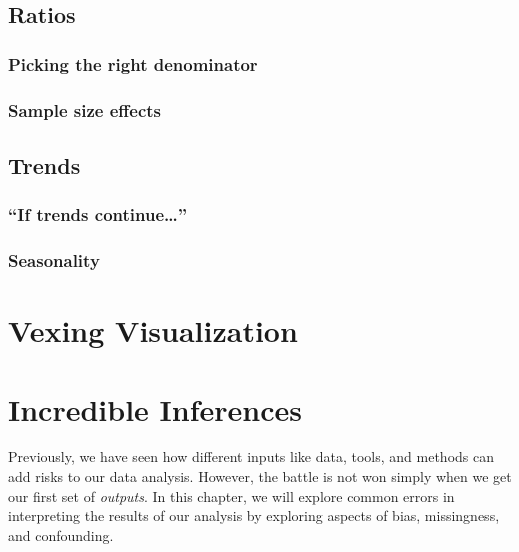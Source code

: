 \documentclass[
]{krantz}
\begin{document}
\hypertarget{ratios}{%
\section{Ratios}\label{ratios}}

\hypertarget{picking-the-right-denominator}{%
\subsection{Picking the right denominator}\label{picking-the-right-denominator}}

\hypertarget{sample-size-effects}{%
\subsection{Sample size effects}\label{sample-size-effects}}

\hypertarget{trends}{%
\section{Trends}\label{trends}}

\hypertarget{if-trends-continue}{%
\subsection{\texorpdfstring{``If trends continue\ldots{}''}{``If trends continue\ldots''}}\label{if-trends-continue}}

\hypertarget{seasonality}{%
\subsection{Seasonality}\label{seasonality}}

\hypertarget{vex-viz}{%
\chapter{Vexing Visualization}\label{vex-viz}}

\hypertarget{incr-infe}{%
\chapter{Incredible Inferences}\label{incr-infe}}

Previously, we have seen how different inputs like data, tools, and methods can add risks to our data analysis. However, the battle is not won simply when we get our first set of \emph{outputs}. In this chapter, we will explore common errors in interpreting the results of our analysis by exploring aspects of bias, missingness, and confounding.
\end{document}
